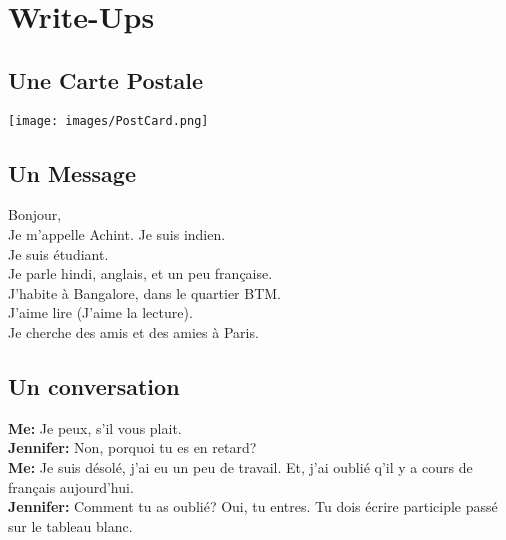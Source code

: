 \section{Write-Ups}

\subsection{Une Carte Postale}
\texttt{[image: images/PostCard.png]}

\subsection{Un Message}
Bonjour,\\
Je m'appelle Achint. Je suis indien.\\
Je suis \'etudiant. \\
Je parle hindi, anglais, et un peu fran\c{c}aise.\\
J'habite \`a Bangalore, dans le quartier BTM.\\
J'aime lire (J'aime la lecture).\\
Je cherche des amis et des amies \`a Paris.\\

\subsection{Un conversation}

\textbf{Me:} Je peux, s'il vous plait.\\
\textbf{Jennifer:} Non, porquoi tu es en retard?\\
\textbf{Me:} Je suis d\'esol\'e, j'ai eu un peu de travail. Et, j'ai oubli\'e q'il y a cours de fran\c{c}ais aujourd'hui.\\
\textbf{Jennifer:} Comment tu as oubli\'e? Oui, tu entres. Tu dois écrire participle passé sur le tableau blanc.\\


